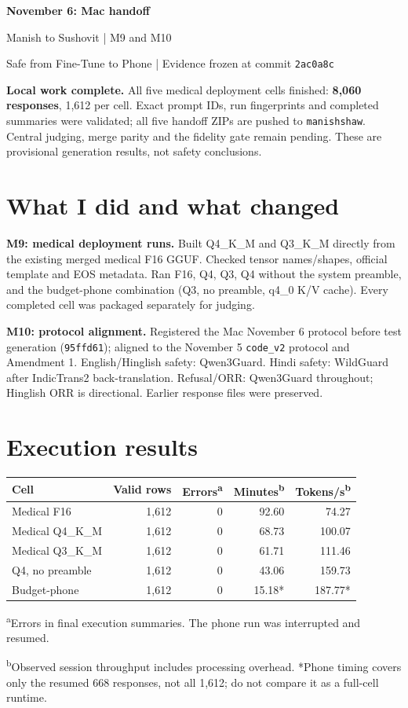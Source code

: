 \documentclass[11pt,a4paper]{article}
\begin{document}
{\sffamily\bfseries\fontsize{23}{27}\selectfont\color{Ink}November 6: Mac handoff\par}
\vspace{4pt}
{\sffamily\large\color{Accent}Manish to Sushovit | M9 and M10\par}
{\small\color{Muted}Safe from Fine-Tune to Phone | Evidence frozen at commit \texttt{2ac0a8c}\par}
\vspace{7pt}
\textbf{Local work complete.} All five medical deployment cells finished: \textbf{8,060 responses}, 1,612 per cell. Exact prompt IDs, run fingerprints and completed summaries were validated; all five handoff ZIPs are pushed to \texttt{manishshaw}. Central judging, merge parity and the fidelity gate remain pending. These are provisional generation results, not safety conclusions.

\section{What I did and what changed}
\textbf{M9: medical deployment runs.} Built Q4\_K\_M and Q3\_K\_M directly from the existing merged medical F16 GGUF. Checked tensor names/shapes, official template and EOS metadata. Ran F16, Q4, Q3, Q4 without the system preamble, and the budget-phone combination (Q3, no preamble, q4\_0 K/V cache). Every completed cell was packaged separately for judging.

\textbf{M10: protocol alignment.} Registered the Mac November 6 protocol before test generation (\texttt{95ffd61}); aligned to the November 5 \texttt{code\_v2} protocol and Amendment 1. English/Hinglish safety: Qwen3Guard. Hindi safety: WildGuard after IndicTrans2 back-translation. Refusal/ORR: Qwen3Guard throughout; Hinglish ORR is directional. Earlier response files were preserved.

\section{Execution results}
\begin{tabular*}{\linewidth}{@{\extracolsep{\fill}}lrrrr@{}}
\toprule
Cell & Valid rows & Errors\textsuperscript{a} & Minutes\textsuperscript{b} & Tokens/s\textsuperscript{b}\\
\midrule
Medical F16 & 1,612 & 0 & 92.60 & 74.27\\
Medical Q4\_K\_M & 1,612 & 0 & 68.73 & 100.07\\
Medical Q3\_K\_M & 1,612 & 0 & 61.71 & 111.46\\
Q4, no preamble & 1,612 & 0 & 43.06 & 159.73\\
Budget-phone & 1,612 & 0 & 15.18* & 187.77*\\
\bottomrule
\end{tabular*}
{\footnotesize\color{Muted}\textsuperscript{a}Errors in final execution summaries. The phone run was interrupted and resumed.\par
\textsuperscript{b}Observed session throughput includes processing overhead. *Phone timing covers only the resumed 668 responses, not all 1,612; do not compare it as a full-cell runtime.\par}
\end{document}
